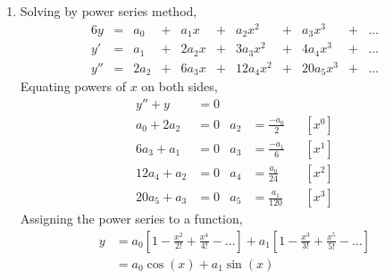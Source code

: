 \begin{enumerate}
    \item Solving by power series method,
          \begin{alignat}{6}
              y     & ={}       & a_0   & {}+{}     & a_1 x  &
              {}+{} & a_2 x^2   & {}+{} & a_3x^3    & {}+{}  & \dots \\
              y'    & ={}       & a_1   & {}+{}     & 2a_2 x &
              {}+{} & 3a_3 x^2  & {}+{} & 4a_4 x^3  & {}+{}  & \dots \\
              y''   & ={}       & 2a_2  & {}+{}     & 6a_3 x &
              {}+{} & 12a_4 x^2 & {}+{} & 20a_5 x^3 & {}+{}  & \dots
          \end{alignat}
          Equating powers of $ x $ on both sides,
          \begin{align}
              y'' + y     & = 0                           \\
              a_0 + 2a_2  & = 0               &
              a_2         & = \frac{-a_0}{2}  &   & [x^0] \\
              6a_3 + a_1  & = 0               &
              a_3         & = \frac{-a_1}{6}  &   & [x^1] \\
              12a_4 + a_2 & = 0               &
              a_4         & = \frac{a_0}{24}  &   & [x^2] \\
              20a_5 + a_3 & = 0               &
              a_5         & = \frac{a_1}{120} &   & [x^3]
          \end{align}
          Assigning the power series to a function,
          \begin{align}
              y & = a_0\left[ 1 - \frac{x^2}{2!} + \frac{x^4}{4!} - \dots \right]
              + a_1 \left[ 1 - \frac{x^3}{3!} + \frac{x^5}{5!} - \dots \right]    \\
                & = a_0 \cos(x) + a_1 \sin(x)
          \end{align}


\end{enumerate}
